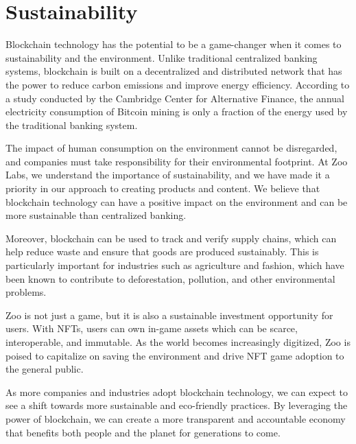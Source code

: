 \section{Sustainability}

Blockchain technology has the potential to be a game-changer when it comes to sustainability and the environment. Unlike traditional centralized banking systems, blockchain is built on a decentralized and distributed network that has the power to reduce carbon emissions and improve energy efficiency. According to a study conducted by the Cambridge Center for Alternative Finance, the annual electricity consumption of Bitcoin mining is only a fraction of the energy used by the traditional banking system.

The impact of human consumption on the environment cannot be disregarded, and companies must take responsibility for their environmental footprint. At Zoo Labs, we understand the importance of sustainability, and we have made it a priority in our approach to creating products and content. We believe that blockchain technology can have a positive impact on the environment and can be more sustainable than centralized banking.

Moreover, blockchain can be used to track and verify supply chains, which can help reduce waste and ensure that goods are produced sustainably. This is particularly important for industries such as agriculture and fashion, which have been known to contribute to deforestation, pollution, and other environmental problems.

Zoo is not just a game, but it is also a sustainable investment opportunity for users. With NFTs, users can own in-game assets which can be scarce, interoperable, and immutable. As the world becomes increasingly digitized, Zoo is poised to capitalize on saving the environment and drive NFT game adoption to the general public.

As more companies and industries adopt blockchain technology, we can expect to see a shift towards more sustainable and eco-friendly practices. By leveraging the power of blockchain, we can create a more transparent and accountable economy that benefits both people and the planet for generations to come.
